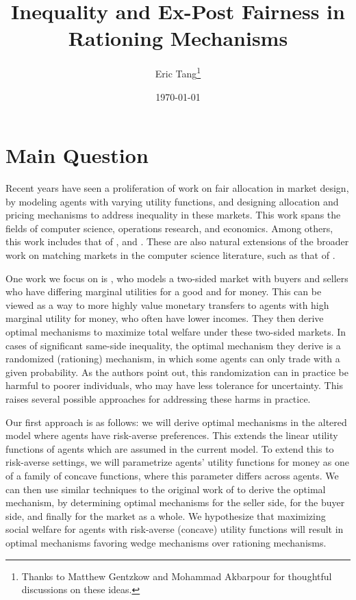 \documentclass[AER]{AEA}
\begin{document}
\title{Inequality and Ex-Post Fairness in Rationing Mechanisms}
\author{Eric Tang\thanks{%
Thanks to Matthew Gentzkow and Mohammad Akbarpour for thoughtful discussions on these ideas.}}
\date{\today}
\JEL{}
\Keywords{}

\begin{abstract}
    
\end{abstract}

\maketitle

\section{Main Question}

Recent years have seen a proliferation of work on fair allocation in market design, by modeling agents with varying utility functions, and designing allocation and pricing mechanisms to address inequality in these markets. This work spans the fields of computer science, operations research, and economics. Among others, this work includes that of \cite{babaioff-2019}, \cite{akbarpour-2020} and \cite{budish-2011}. These are also natural extensions of the broader work on matching markets in the computer science literature, such as that of \cite{alaei-2017}.

One work we focus on is \cite{dworczak-2020}, who models a two-sided market with buyers and sellers who have differing marginal utilities for a good and for money. This can be viewed as a way to more highly value monetary transfers to agents with high marginal utility for money, who often have lower incomes. They then derive optimal mechanisms to maximize total welfare under these two-sided markets. In cases of significant same-side inequality, the optimal mechanism they derive is a randomized (rationing) mechanism, in which some agents can only trade with a given probability. As the authors point out, this randomization can in practice be harmful to poorer individuals, who may have less tolerance for uncertainty. This raises several possible approaches for addressing these harms in practice.

Our first approach is as follows: we will derive optimal mechanisms in the altered model where agents have risk-averse preferences. This extends the linear utility functions of agents which are assumed in the current model. To extend this to risk-averse settings, we will parametrize agents' utility functions for money as one of a family of concave functions, where this parameter differs across agents. We can then use similar techniques to the original work of \cite{dworczak-2020} to derive the optimal mechanism, by determining optimal mechanisms for the seller side, for the buyer side, and finally for the market as a whole. We hypothesize that maximizing social welfare for agents with risk-averse (concave) utility functions will result in optimal mechanisms favoring wedge mechanisms over rationing mechanisms.
\end{document}
